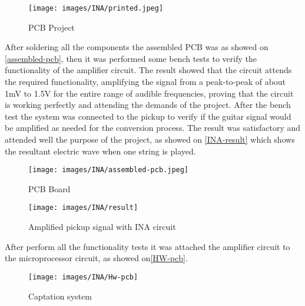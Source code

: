\begin{figure}[!htpb]
  \centering
  \caption{PCB Project}
  \label{INA-printed}
  \texttt{[image: images/INA/printed.jpeg]}
\end{figure}


After soldering all the components the assembled PCB was as showed on \autoref{assembled-pcb},
then it was performed some bench tests to verify the
functionality of the amplifier circuit. The result showed that the circuit attends
the required functionality, amplifying the signal from a peak-to-peak of about 1mV
to 1.5V for the entire range of audible frequencies, proving that the circuit is
working perfectly and attending the demands of the project. After the bench test
the system was connected to the pickup to verify if the guitar signal would be
amplified as needed for the conversion process. The result was satisfactory and
attended well the purpose of the project, as showed on \autoref{INA-result} which shows
the resultant electric wave when one string is played.

\begin{figure}[!htpb]
  \centering
  \caption{PCB Board}
  \label{assembled-pcb}
  \texttt{[image: images/INA/assembled-pcb.jpeg]}
\end{figure}

\begin{figure}[!htpb]
\centering
\caption{Amplified pickup signal with INA circuit}
\label{INA-result}
\texttt{[image: images/INA/result]}
\end{figure}

After perform all the functionality tests it was attached the amplifier circuit to the microprocessor
circuit, as showed on\autoref{HW-pcb}.

\begin{figure}[!htpb]
\centering
\caption{Captation system}
\label{HW-pcb}
\texttt{[image: images/INA/Hw-pcb]}
\end{figure}

